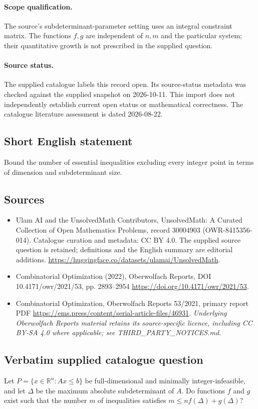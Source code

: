 \documentclass[11pt]{article}
\begin{document}
\paragraph{Scope qualification.}
The source's subdeterminant-parameter setting uses an integral constraint matrix. The functions $f,g$ are independent of $n,m$ and the particular system; their quantitative growth is not prescribed in the supplied question.
\paragraph{Source status.}
The supplied catalogue labels this record open. Its source-status metadata was checked against the supplied snapshot on 2026-10-11. This import does not independently establish current open status or mathematical correctness. The catalogue literature assessment is dated 2026-08-22.
\subsection{Short English statement}
Bound the number of essential inequalities excluding every integer point in terms of dimension and subdeterminant size.
\subsection{Sources}
\begin{itemize}
\item[S1] Ulam AI and the UnsolvedMath Contributors, UnsolvedMath: A Curated Collection of Open Mathematics Problems, record 30004903 (OWR-8415356-014). Catalogue curation and metadata: CC BY 4.0. The supplied source question is retained; definitions and the English summary are editorial additions.
\url{https://huggingface.co/datasets/ulamai/UnsolvedMath}.
\item[S2] Combinatorial Optimization (2022), Oberwolfach Reports, DOI 10.4171/owr/2021/53, pp. 2893--2954
\url{https://doi.org/10.4171/owr/2021/53}.
\item[S3] Combinatorial Optimization, Oberwolfach Reports 53/2021, primary report PDF
\url{https://ems.press/content/serial-article-files/46931}.
\textit{Underlying Oberwolfach Reports material retains its source-specific licence, including CC BY-SA 4.0 where applicable; see THIRD\_PARTY\_NOTICES.md.}
\end{itemize}
\subsection{Verbatim supplied catalogue question}
Let $P=\{x\in\mathbb R^n:Ax\leq b\}$ be full-dimensional and minimally integer-infeasible, and let $\Delta$ be the maximum absolute subdeterminant of $A$. Do functions $f$ and $g$ exist such that the number $m$ of inequalities satisfies $m\leq nf(\Delta)+g(\Delta)$?
\end{document}
